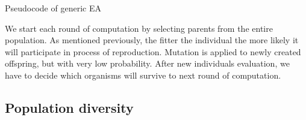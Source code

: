 % 
% 
% 


\begin{algorithm}
 
  \BlankLine
  \initialise{\population} \;
  

  \caption{Pseudocode of generic EA}\label{pseudo_EA}
\end{algorithm}

We start each round of computation by selecting parents from the entire population.
As mentioned previously, the fitter the individual the more likely it will participate in process of reproduction.
Mutation is applied to newly created offspring, but with very low probability.
After new individuals evaluation, we have to decide which organisms will survive to next round of computation. 


\subsection{Population diversity}
\label{sec:population_diversity}

